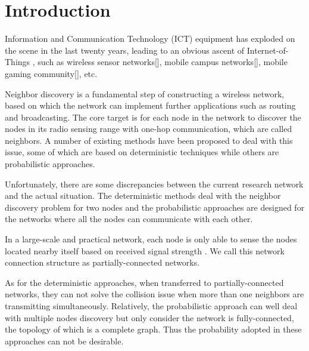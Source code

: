 \section{Introduction}



Information and Communication Technology (ICT) equipment \cite{zeadally2012energy} has exploded 
on the scene in the last twenty years, leading to an obvious ascent of Internet-of-Things \cite{atzori2010internet},
such as wireless sensor networks[], mobile campus networks[], mobile gaming community[], etc.


Neighbor discovery is a fundamental step of constructing a wireless network, based on 
which the network can implement further applications such as routing and broadcasting.
The core target is for each node in the network to discover the nodes in its radio sensing range 
with one-hop communication, which are called neighbors. 
A number of existing methods \cite{dutta2008practical,kandhalu2010u,
bakht2012searchlight,sun2014hello,chen2015heterogeneous,
wang2015blinddate,qiu2016talk,mcglynn2001birthday,
vasudevan2009neighbor,you2011aloha,song2014probabilistic} have been proposed 
to deal with this issue, some of which are based on deterministic techniques while others
are probabilistic approaches.


Unfortunately, there are some discrepancies between the current research network and the actual situation.
The deterministic methods deal with the neighbor discovery problem for two nodes and the
probabilistic approaches are designed for the networks where all the nodes can communicate with each other.


In a large-scale and practical network, each node is only able to sense the 
nodes located nearby itself based on received signal strength \cite{wang2013gaussian}.  
We call this network connection structure as partially-connected networks.


As for the deterministic approaches, when transferred to partially-connected networks,
they can not solve the collision issue when more than one neighbors are transmitting simultaneously. 
Relatively, the probabilistic approach can well deal with multiple nodes discovery but only consider
the network is fully-connected, the topology of which is a complete graph. 
Thus the probability adopted in these approaches can not be desirable.


